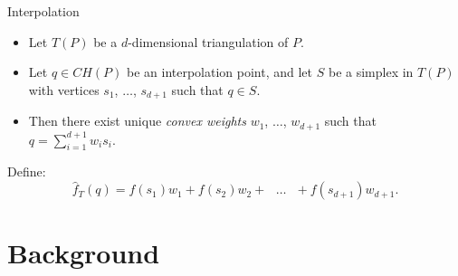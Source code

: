 \documentclass[xcolor=dvipsnames]{beamer}
\begin{document}
\begin{frame}{Interpolation}
\begin{itemize}
\item Let $T(P)$ be a $d$-dimensional triangulation of $P$.
\item Let $q \in CH(P)$ be an interpolation point, and let $S$ be a simplex
in $T(P)$ with vertices $s_1$, $\ldots$, $s_{d+1}$ such that $q\in S$.
\item Then there exist unique {\it convex weights} $w_1$, $\ldots$, $w_{d+1}$ 
such that $q = \sum_{i=1}^{d+1} w_i s_i$.
\end{itemize}
Define:
$$
\hat{f}_T (q) = f(s_1) w_1 + f(s_2) w_2 + \text{ $\ldots$ } + f(s_{d+1})w_{d+1}.
$$
\end{frame}

\section{Background}
\end{document}
